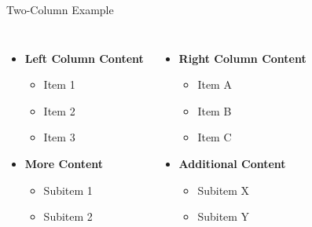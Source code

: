 \begin{frame}{Two-Column Example}
\begin{columns}
    \begin{itemize}
        \item \textbf{Left Column Content}
        \begin{itemize}
            \item Item 1
            \item Item 2
            \item Item 3
        \end{itemize}
        \item \textbf{More Content}
        \begin{itemize}
            \item Subitem 1
            \item Subitem 2
        \end{itemize}
    \end{itemize}
    
    \begin{itemize}
        \item \textbf{Right Column Content}
        \begin{itemize}
            \item Item A
            \item Item B
            \item Item C
        \end{itemize}
        \item \textbf{Additional Content}
        \begin{itemize}
            \item Subitem X
            \item Subitem Y
        \end{itemize}
    \end{itemize}
\end{columns}
\end{frame}

